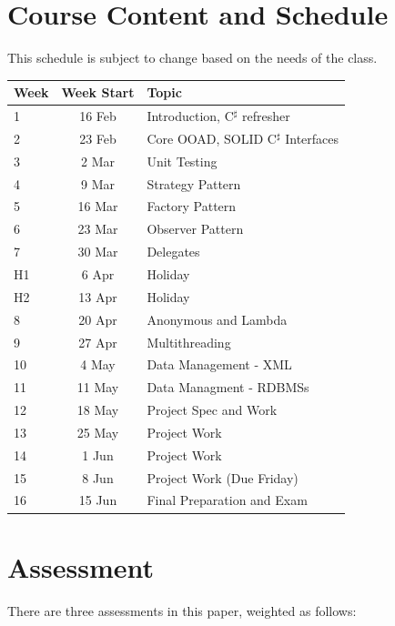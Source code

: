 \documentclass{article}
\newcommand{\Csh}{C$^\sharp$}
\begin{document}
\section*{Course Content and Schedule}
This schedule is subject to change based on the needs of the class.

\renewcommand{\arraystretch}{1.5}
\begin{tabular}{|l|c|l|}
\hline
 Week & Week Start & Topic                         \\ \hline
 1    & 16 Feb     & Introduction, \Csh{} refresher \\ \hline
 2    & 23 Feb     & Core OOAD, SOLID  \Csh{} Interfaces \\ \hline
 3    &  2 Mar     & Unit Testing   \\ \hline
 4    &  9 Mar     & Strategy Pattern    \\ \hline
 5    & 16 Mar     & Factory Pattern   \\ \hline
 6    & 23 Mar     & Observer Pattern     \\ \hline
 7    & 30 Mar     & Delegates   \\ \hline
 H1   &  6 Apr     & Holiday             \\ \hline
 H2   & 13 Apr     & Holiday             \\ \hline
 8    & 20 Apr     & Anonymous and Lambda   \\ \hline
 9    & 27 Apr     & Multithreading        \\ \hline
 10   &  4 May     & Data Management - XML \\ \hline
 11   & 11 May     & Data Managment - RDBMSs  \\ \hline
 12   & 18 May     & Project Spec and Work \\ \hline
 13   & 25 May     & Project Work   \\ \hline
 14   &  1 Jun     & Project Work   \\ \hline
15   &  8 Jun     & Project Work  (Due Friday)  \\ \hline
 16   & 15 Jun     & Final Preparation and Exam \\ \hline
\end{tabular}

\newpage

\section*{Assessment}
There are three assessments in this paper, weighted as follows:
\end{document}
